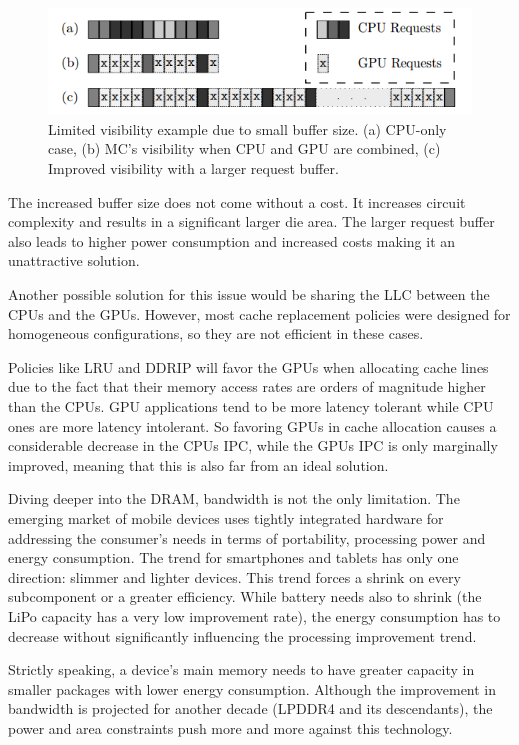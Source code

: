 \documentclass[journal]{IEEEtran}
\begin{document}
\begin{figure}[H]
\centering
\includegraphics[width = 8 cm]{graphics/no1.png}
\caption{Limited visibility example due to small buffer size. (a) CPU-only
case, (b) MC’s visibility when CPU and GPU are combined, (c) Improved
visibility with a larger request buffer.\cite{SmS}}\label{fig:buff}
\end{figure} 

The increased buffer size does not come without a cost. It increases circuit complexity and results in a significant larger die area. The larger request buffer also leads to higher power consumption and increased costs \cite{SmS} making it an unattractive solution. 

Another possible solution for this issue would be sharing the LLC between the CPUs and the GPUs. However, most cache replacement policies were designed for homogeneous configurations, so they are not efficient in these cases.

Policies like LRU and DDRIP will favor the GPUs when allocating cache lines due to the fact that their memory access rates are orders of magnitude higher than the CPUs. GPU applications tend to be more latency tolerant while CPU ones are more latency intolerant. So favoring GPUs in cache allocation causes a considerable decrease in the CPUs IPC, while the GPUs IPC is only marginally improved, meaning that this is also far from an ideal solution.

Diving deeper into the DRAM, bandwidth is not the only limitation. The emerging market of mobile devices uses tightly integrated hardware for addressing the consumer's needs in terms of portability, processing power and energy consumption. The trend for smartphones and tablets has only one direction: slimmer and lighter devices. This trend forces a shrink on every subcomponent or a greater efficiency. While battery needs also to shrink (the LiPo capacity has a very low improvement rate), the energy consumption has to decrease without significantly influencing the processing improvement trend. 

Strictly speaking, a device's main memory needs to have greater capacity in smaller packages with lower energy consumption. Although the improvement in bandwidth is projected for another decade (LPDDR4 and its descendants), the power and area constraints push more and more against this technology.
\end{document}
